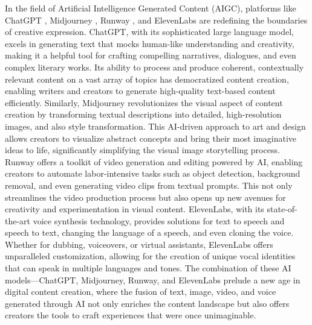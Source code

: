 \documentclass[11pt,a4paper,oneside]{report}
\begin{document}
In the field of Artificial Intelligence Generated Content (AIGC), platforms like ChatGPT \cite{leiter2023chatgpt} \cite{openai2023gpt}, Midjourney \cite{MidjourneyExplore}, Runway \cite{runwayml}, and ElevenLabs \cite{elevenlabs} are redefining the boundaries of creative expression. 
ChatGPT, with its sophisticated large language model, excels in generating text that mocks human-like understanding and creativity, making it a helpful tool for crafting compelling narratives, dialogues, and even complex literary works. 
Its ability to process and produce coherent, contextually relevant content on a vast array of topics has democratized content creation, enabling writers and creators to generate high-quality text-based content efficiently. 
Similarly, Midjourney revolutionizes the visual aspect of content creation by transforming textual descriptions into detailed, high-resolution images, and also style transformation.
This AI-driven approach to art and design allows creators to visualize abstract concepts and bring their most imaginative ideas to life, significantly simplifying the visual image storytelling process. 
Runway offers a toolkit of video generation and editing powered by AI, enabling creators to automate labor-intensive tasks such as object detection, background removal, and even generating video clips from textual prompts. 
This not only streamlines the video production process but also opens up new avenues for creativity and experimentation in visual content. 
ElevenLabs, with its state-of-the-art voice synthesis technology, provides solutions for text to speech and speech to text, changing the language of a speech, and even cloning the voice.
Whether for dubbing, voiceovers, or virtual assistants, ElevenLabs offers unparalleled customization, allowing for the creation of unique vocal identities that can speak in multiple languages and tones. 
The combination of these AI models—ChatGPT, Midjourney, Runway, and ElevenLabs prelude a new age in digital content creation, where the fusion of text, image, video, and voice generated through AI not only enriches the content landscape but also offers creators the tools to craft experiences that were once unimaginable.
\end{document}
